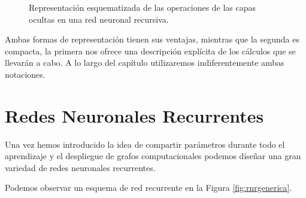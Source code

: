 \begin{enumerate}
	
	\begin{figure}[h!]
		\centering
		\caption{Representación esquematizada de las operaciones de las capas ocultas en una red neuronal recursiva.}
		\label{fig:forma2}
	\end{figure}

\end{enumerate}
	
	Ambas formas de representación tienen sus ventajas, mientras que la segunda es compacta, la primera nos ofrece una descripción explícita de los cálculos que se llevarán a cabo. A lo largo del capítulo utilizaremos indiferentemente ambas notaciones. 
	
	\section{Redes Neuronales Recurrentes}
	
	Una vez hemos introducido la idea de compartir parámetros durante todo el aprendizaje y el despliegue de grafos computacionales podemos diseñar una gran variedad de redes neuronales recurrentes. 
	
	Podemos observar un esquema de red recurrente en la Figura  \ref{fig:rnrgenerica}.
	
